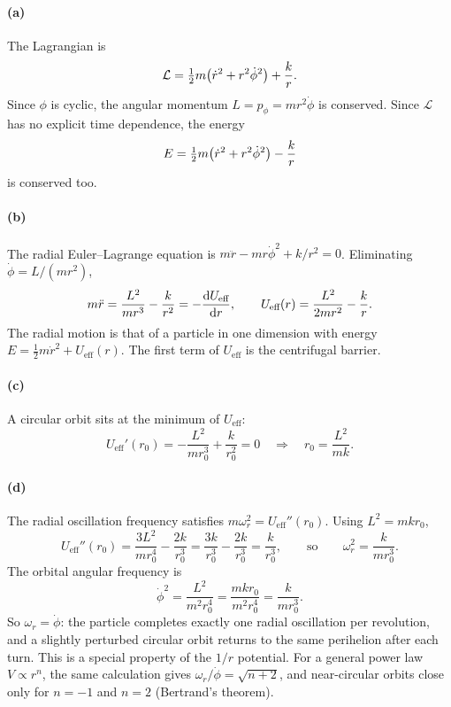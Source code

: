 \documentclass[11pt]{article}
\theoremstyle{definition}
\newcommand{\Lag}{\mathcal{L}}
\begin{document}
\paragraph{(a)} The Lagrangian is
\begin{equation}
  \Lag = \tfrac12 m\qty(\dot r^2 + r^2\dot\phi^2) + \frac{k}{r}.
\end{equation}
Since $\phi$ is cyclic, the angular momentum $L = p_\phi = mr^2\dot\phi$ is conserved. Since $\Lag$ has no explicit time dependence, the energy
\[
  E = \tfrac12 m\qty(\dot r^2 + r^2\dot\phi^2) - \frac{k}{r}
\]
is conserved too.

\paragraph{(b)} The radial Euler--Lagrange equation is $m\ddot r - mr\dot\phi^2 + k/r^2 = 0$. Eliminating $\dot\phi = L/(mr^2)$,
\begin{equation}
  m\ddot r = \frac{L^2}{mr^3} - \frac{k}{r^2} = -\dv{U_{\text{eff}}}{r},
  \qquad
  U_{\text{eff}}(r) = \frac{L^2}{2mr^2} - \frac{k}{r}.
\end{equation}
The radial motion is that of a particle in one dimension with energy $E = \tfrac12 m\dot r^2 + U_{\text{eff}}(r)$. The first term of $U_{\text{eff}}$ is the centrifugal barrier.

\paragraph{(c)} A circular orbit sits at the minimum of $U_{\text{eff}}$:
\[
  U_{\text{eff}}'(r_0) = -\frac{L^2}{mr_0^3} + \frac{k}{r_0^2} = 0
  \quad\Longrightarrow\quad
  r_0 = \frac{L^2}{mk}.
\]

\paragraph{(d)} The radial oscillation frequency satisfies $m\omega_r^2 = U_{\text{eff}}''(r_0)$. Using $L^2 = mkr_0$,
\[
  U_{\text{eff}}''(r_0) = \frac{3L^2}{mr_0^4} - \frac{2k}{r_0^3} = \frac{3k}{r_0^3} - \frac{2k}{r_0^3} = \frac{k}{r_0^3},
  \qquad\text{so}\qquad
  \omega_r^2 = \frac{k}{mr_0^3}.
\]
The orbital angular frequency is
\[
  \dot\phi^2 = \frac{L^2}{m^2r_0^4} = \frac{mkr_0}{m^2r_0^4} = \frac{k}{mr_0^3}.
\]
So $\omega_r = \dot\phi$: the particle completes exactly one radial oscillation per revolution, and a slightly perturbed circular orbit returns to the same perihelion after each turn. This is a special property of the $1/r$ potential. For a general power law $V \propto r^n$, the same calculation gives $\omega_r/\dot\phi = \sqrt{n + 2}$, and near-circular orbits close only for $n = -1$ and $n = 2$ (Bertrand's theorem).
\end{document}
